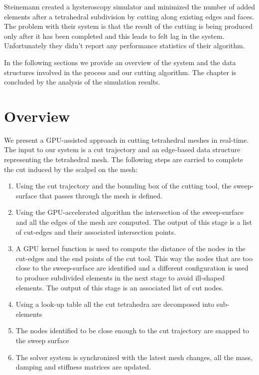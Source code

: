 Steinemann \etal \cite{Steinemann} created a hysteroscopy simulator and minimized the number of added elements 
after a tetrahedral subdivision by cutting along existing edges and faces. The problem with their system is that
the result of the cutting is being produced only after it has been completed and this leads to felt lag in the system. 
Unfortunately they didn't report any performance statistics of their algorithm. 

In the following sections we provide an overview of the system and the data structures involved in the process 
and our cutting algorithm. The chapter is concluded by the analysis of the simulation results.

\section{Overview}
We present a GPU-assisted approach in cutting tetrahedral meshes in real-time. 
The input to our system is a cut trajectory and an edge-based data structure representing the tetrahedral mesh. 
The following steps are carried to complete the cut induced by the scalpel on the mesh:

\begin{enumerate}
 \item Using the cut trajectory and the bounding box of the cutting tool, the sweep-surface that passes through 
 the mesh is defined.
 \item Using the GPU-accelerated algorithm the intersection of the sweep-surface and all the edges of the mesh 
 are computed. The output of this stage is a list of cut-edges and their associated intersection points. 
 
 \item A GPU kernel function is used to compute the distance of the nodes in the cut-edges and the end points of 
 the cut tool. This way the nodes that are too close to the sweep-surface are identified and a different configuration 
 is used to produce subdivided elements in the next stage to avoid ill-shaped elements. The output of this stage is an
 associated list of cut nodes.
 
 \item Using a look-up table all the cut tetrahedra are decomposed into sub-elements
 
 \item The nodes identified to be close enough to the cut trajectory are snapped to the sweep surface
 
 \item The solver system is synchronized with the latest mesh changes, all the mass, damping and stiffness 
 matrices are updated.
\end{enumerate}


